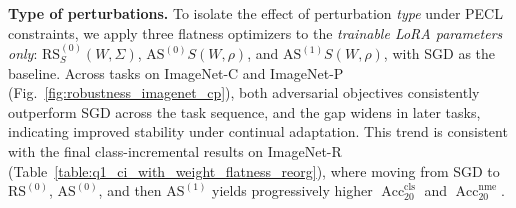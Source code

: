 \documentclass{article}
\theoremstyle{plain}
\theoremstyle{definition}
\theoremstyle{remark}
\begin{document}











\noindent\textbf{Type of perturbations.}\quad
To isolate the effect of perturbation \emph{type} under PECL constraints, we apply three flatness optimizers to the \emph{trainable LoRA parameters only}:
$\mathrm{RS}^{(0)}_S(W,\Sigma)$, $\mathrm{AS}^{(0)}S(W,\rho)$, and $\mathrm{AS}^{(1)}S(W,\rho)$, with SGD as the baseline.
Across tasks on ImageNet-C and ImageNet-P (Fig.~\ref{fig:robustness_imagenet_cp}), both adversarial objectives consistently outperform SGD across the task sequence, and the gap widens in later tasks, indicating improved stability under continual adaptation. This trend is consistent with the final class-incremental results on ImageNet-R (Table~\ref{table:q1_ci_with_weight_flatness_reorg}), where moving from SGD to $\mathrm{RS}^{(0)}$, $\mathrm{AS}^{(0)}$, and then $\mathrm{AS}^{(1)}$ yields progressively higher $\operatorname{Acc}^{\mathrm{cls}}_{20}$ and $\operatorname{Acc}^{\mathrm{nme}}_{20}$.
\end{document}

